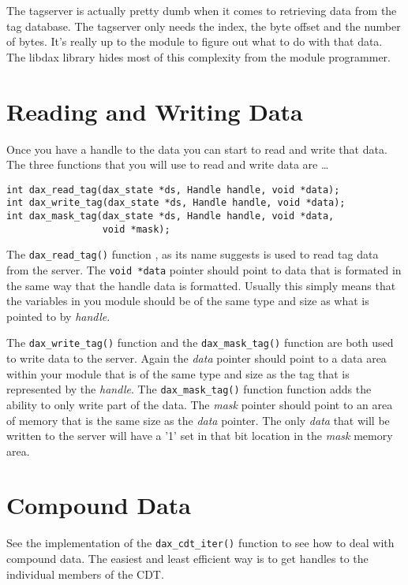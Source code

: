 The tagserver is actually pretty dumb when it comes to retrieving data from the tag database.  The
tagserver only needs the index, the byte offset and the number of bytes.  It's really up to the
module to figure out what to do with that data.  The libdax library hides most of this complexity
from the module programmer.

\section{Reading and Writing Data}

Once you have a handle to the data you can start to read and write that data.  The three functions that you will use to read and write data are \ldots

\begin{verbatim}
int dax_read_tag(dax_state *ds, Handle handle, void *data);
int dax_write_tag(dax_state *ds, Handle handle, void *data);
int dax_mask_tag(dax_state *ds, Handle handle, void *data,
                 void *mask);
\end{verbatim}

The \verb|dax_read_tag()| function , as its name suggests is used to read tag data from the server.  The \verb|void *data| pointer should point to data that is formated in the same way that the handle data is formatted.  Usually this simply means that the variables in you module should be of the same type and size as what is pointed to by \emph{handle}.

The \verb|dax_write_tag()| function  and the \verb|dax_mask_tag()| function  are both used to write data to the server.  Again the \emph{data} pointer should point to a data area within your module that is of the same type and size as the tag that is represented by the \emph{handle}.  The \verb|dax_mask_tag()| function function adds the ability to only write part of the data.  The \emph{mask} pointer should point to an area of memory that is the same size as the \emph{data} pointer.  The only \emph{data} that will be written to the server will have a '1' set in that bit location in the \emph{mask} memory area.

\section{Compound Data}

See the implementation of the \verb|dax_cdt_iter()| function  to see how to deal with compound data.  The easiest and least efficient way is to get handles to the individual members of the CDT.

